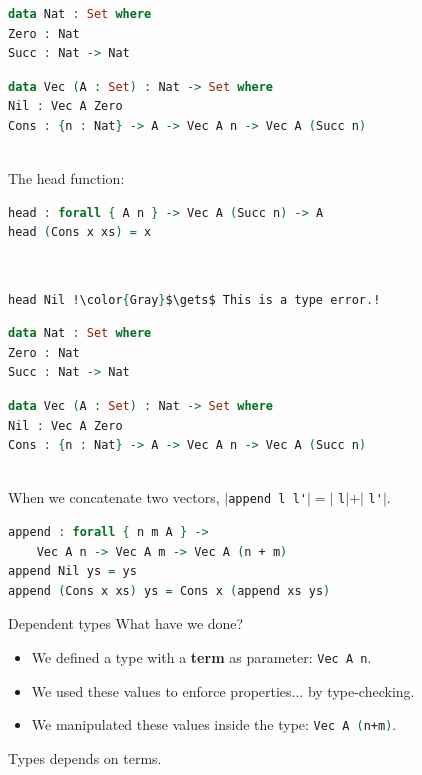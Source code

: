 \documentclass[xcolor=svgnames,11pt]{beamer}
\begin{document}
\begin{frame}[fragile]
\begin{lstlisting}[basicstyle=\footnotesize\ttfamily,language=Agda]
data Nat : Set where
Zero : Nat
Succ : Nat -> Nat
\end{lstlisting}
\begin{lstlisting}[basicstyle=\footnotesize\ttfamily,language=Agda]
data Vec (A : Set) : Nat -> Set where
Nil : Vec A Zero
Cons : {n : Nat} -> A -> Vec A n -> Vec A (Succ n)
\end{lstlisting}

\ \\The head function:
\begin{lstlisting}[language=Agda]
head : forall { A n } -> Vec A (Succ n) -> A
head (Cons x xs) = x
\end{lstlisting}\pause

\ \\
\begin{lstlisting}[language=Agda]
  head Nil !\color{Gray}$\gets$ This is a type error.!
\end{lstlisting}
\end{frame}

\begin{frame}[fragile]
\begin{lstlisting}[basicstyle=\footnotesize\ttfamily,language=Agda]
data Nat : Set where
Zero : Nat
Succ : Nat -> Nat
\end{lstlisting}
\begin{lstlisting}[basicstyle=\footnotesize\ttfamily,language=Agda]
data Vec (A : Set) : Nat -> Set where
Nil : Vec A Zero
Cons : {n : Nat} -> A -> Vec A n -> Vec A (Succ n)
\end{lstlisting}

\ \\When we concatenate two vectors, $|$\lstinline[language=caml,basicstyle=\ttfamily]{append l l'}$| = |$
\lstinline[language=caml,basicstyle=\ttfamily]{l}$| + |$
\lstinline[language=caml,basicstyle=\ttfamily]{l'}$|$.\pause
\begin{lstlisting}[language=Agda]
append : forall { n m A } ->
    Vec A n -> Vec A m -> Vec A (n + m)
append Nil ys = ys
append (Cons x xs) ys = Cons x (append xs ys)
\end{lstlisting}
\end{frame}

\begin{frame}{Dependent types}
What have we done?
\begin{itemize}
\item We defined a type with a {\bf term} as parameter:
\lstinline[language=Agda,basicstyle=\ttfamily]{Vec A n}.\pause
\item We used these values to enforce properties.\pause.. by type-checking.\pause
\item We manipulated these values inside the type: \lstinline[language=Agda,basicstyle=\ttfamily]{Vec A (n+m)}.
\end{itemize}\pause

Types depends on terms.
\end{frame}
\end{document}
